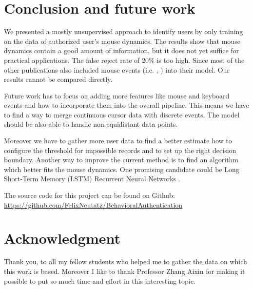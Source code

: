 \documentclass[conference]{IEEEtran}
\begin{document}
\section{Conclusion and future work}
\label{sec:conclusion}
We presented a mostly unsupervised approach to identify users by only training on the data of authorized user's mouse dynamics. The results show that mouse dynamics
contain a good amount of information, but it does not yet suffice for practical applications. The false reject rate of 20\% is too high. Since most of the other publications also included mouse events (i.e. \cite{zheng2011efficient}, \cite{pusara2004user}) into their model. Our results cannot be compared directly.

Future work has to focus on adding more features like mouse and keyboard events and how to incorporate them into the overall pipeline. This means we have to find a way to merge continuous cursor data with discrete events. The model should be also able to handle non-equidistant data points. 

Moreover we have to gather more user data to find a better estimate how to configure the threshold for impossible records and to set up the right decision boundary. Another way to improve the current method is to find an algorithm which better fits the mouse dynamics. One promising candidate could be Long Short-Term Memory (LSTM) Recurrent Neural Networks \cite{NIPS2014_5346}.

The source code for this project can be found on Github: \url{https://github.com/FelixNeutatz/BehavioralAuthentication} 

\section*{Acknowledgment}
Thank you, to all my fellow students who helped me to gather the data on which this work is based. Moreover I like to thank Professor Zhang Aixin for making it possible to put so much time and effort in this interesting topic.


%
%
\end{document}
